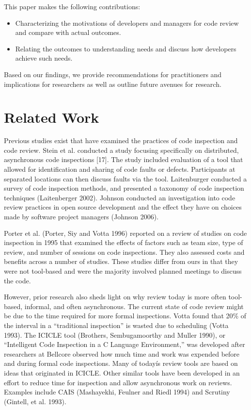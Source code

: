 \documentclass[conference]{IEEEtran}
\begin{document}
This paper makes the following contributions:
\begin{itemize}
  \item Characterizing the motivations of developers and managers for code review and compare with actual outcomes.
  \item Relating the outcomes to understanding needs and discuss how developers achieve such needs.
\end{itemize}

Based on our findings, we provide recommendations for practitioners and
implications for researchers as well as outline future avenues for research.

\section{Related Work}

Previous studies exist that have examined the practices of code inspection and
code review.  Stein et al. conducted a study focusing specifically on
distributed, asynchronous code inspections [17]. The study included evaluation
of a tool that allowed for identification and sharing of code faults or
defects. Participants at separated locations can then discuss faults via the
tool. Laitenburger conducted a survey of code inspection methods, and presented
a taxonomy of code inspection techniques (Laitenberger 2002). Johnson conducted
an investigation into code review practices in open source development and the
effect they have on choices made by software project managers (Johnson 2006).

Porter et al. (Porter, Siy and Votta 1996) reported on a review of studies on
code inspection in 1995 that examined the effects of factors such as team size,
type of review, and number of sessions on code inspections.  They also assessed
costs and benefits across a number of studies.  These studies differ from ours
in that they were not tool-based and were the majority involved planned
meetings to discuss the code.

However, prior research also sheds light on why review today is more often
tool-based, informal, and often asynchronous. The current state of code review
might be due to the time required for more formal inspections.  Votta found
that 20\% of the interval in a ``traditional inspection'' is wasted due to
scheduling (Votta 1993). The ICICLE tool (Brothers, Sembugamoorthy and Muller
1990), or ``Intelligent Code Inspection in a C Language Environment,'' was
developed after researchers at Bellcore observed how much time and work was
expended before and during formal code inspections. Many of todayís review
tools are based on ideas that originated in ICICLE.  Other similar tools have
been developed in an effort to reduce time for inspection and allow
asynchronous work on reviews.   Examples include CAIS  (Mashayekhi, Feulner and
Riedl 1994) and Scrutiny (Gintell, et al. 1993).
\end{document}

